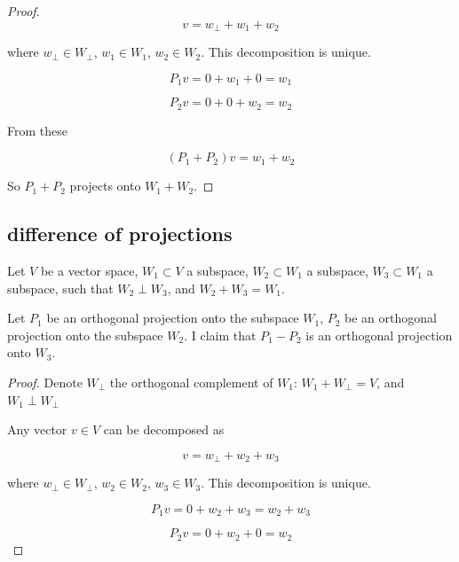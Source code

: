 \documentclass{article}
\begin{document}
\begin{appendices}
\begin{proof}
\begin{equation}
    v = w_{\perp} + w_1 + w_2
\end{equation}

where $w_{\perp} \in W_{\perp}$, $w_1 \in W_1$, $w_2 \in W_2$. This decomposition is unique.

\begin{equation}
    P_1 v = 0 + w_1 + 0 = w_1
\end{equation}

\begin{equation}
    P_2 v = 0 + 0 + w_2 = w_2
\end{equation}

From these

\begin{equation}
    (P_1 + P_2) v = w_1 + w_2
\end{equation}

So $P_1 + P_2$ projects onto $W_1 + W_2$.

\end{proof}


\subsection{difference of projections} \label{app:diff_proj}

Let $V$ be a vector space, $W_1 \subset V$ a subspace, $W_2 \subset W_1$ a subspace, $W_3 \subset W_1$ a subspace, such that $W_2 \perp W_3$, and $W_2 + W_3 = W_1$.

Let $P_1$ be an orthogonal projection onto the subspace $W_1$, $P_2$ be an orthogonal projection onto the subspace $W_2$. I claim that $P_1 - P_2$ is an orthogonal projection onto $W_3$.

\begin{proof}
Denote $W_{\perp}$ the orthogonal complement of $W_1$: $W_1 + W_{\perp} = V$, and $W_1 \perp W_{\perp}$

Any vector $v \in V$ can be decomposed as

\begin{equation}
    v = w_{\perp} + w_2 + w_3
\end{equation}

where $w_{\perp} \in W_{\perp}$, $w_2 \in W_2$, $w_3 \in W_3$. This decomposition is unique.

\begin{equation}
    P_1 v = 0 + w_2 + w_3 = w_2 + w_3
\end{equation}

\begin{equation}
    P_2 v = 0 + w_2 + 0 = w_2
\end{equation}


\end{proof}
\end{appendices}
\end{document}

